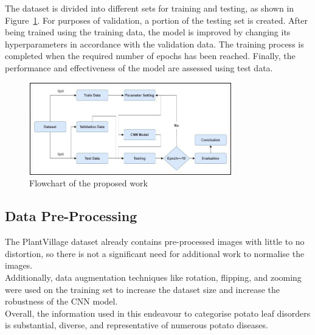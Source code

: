 \documentclass[conference]{IEEEtran}
\begin{document}
The dataset is divided into different sets for training and testing, as shown in Figure~\ref{fig: Figure 1}. For purposes of validation, a portion of the testing set is created. After being trained using the training data, the model is improved by changing its hyperparameters in accordance with the validation data. The training process is completed when the required number of epochs has been reached. Finally, the performance and effectiveness of the model are assessed using test data.

\begin{figure}[H]
 \includegraphics[width=8.8cm, height=4cm]{Tomato Final Flowchart.jpg}
\caption{Flowchart of the proposed work}
\label{fig: Figure 1}
\end{figure}

\subsection{Data Pre-Processing}
The PlantVillage dataset already contains pre-processed images with little to no distortion, so there is not a significant need for additional work to normalise the images.\\
Additionally, data augmentation techniques like rotation, flipping, and zooming were used on the training set to increase the dataset size and increase the robustness of the CNN model.\\
Overall, the information used in this endeavour to categorise potato leaf disorders is substantial, diverse, and representative of numerous potato diseases.




\end{document}
